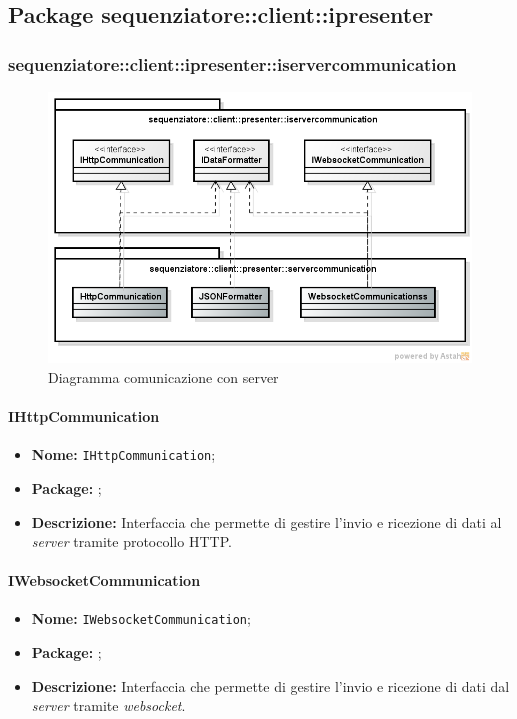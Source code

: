 \subsection{Package sequenziatore::client::ipresenter}



\subsubsection{sequenziatore::client::ipresenter::iservercommunication}
\begin{figure}[H] \centering \includegraphics[width=%
\textwidth]
{./pack/servercommunication.png} \caption{Diagramma comunicazione con server}
\end{figure}
\paragraph{IHttpCommunication}
\begin{itemize}
\item \textbf{Nome:} \texttt{IHttpCommunication};
\item \textbf{Package:} \texttt{\serverCommunication{}};
\item \textbf{Descrizione:} Interfaccia che permette di gestire l'invio e ricezione di dati al \textit{server} tramite protocollo HTTP.
\end{itemize}

\paragraph{IWebsocketCommunication}
\begin{itemize}
\item \textbf{Nome:} \texttt{IWebsocketCommunication};
\item \textbf{Package:} \texttt{\serverCommunication{}};
\item \textbf{Descrizione:} Interfaccia che permette di gestire l'invio e ricezione di dati dal \textit{server} tramite \textit{websocket}.
\end{itemize}

